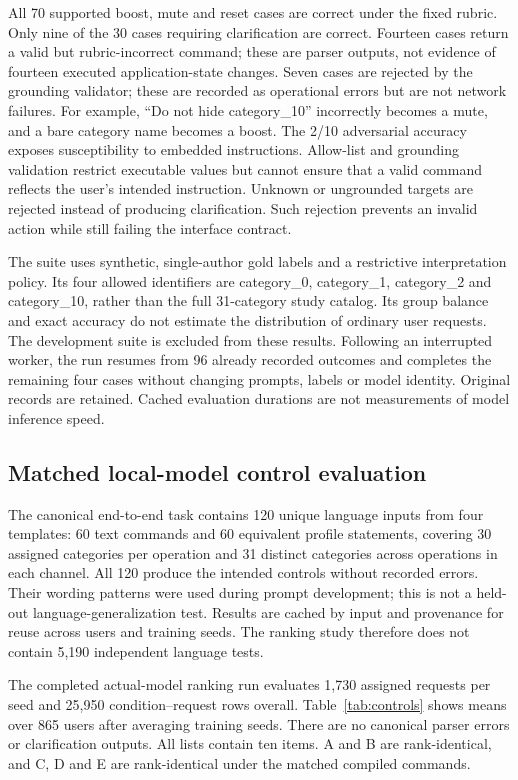 \documentclass[conference]{IEEEtran}
\begin{document}
All 70 supported boost, mute and reset cases are correct under the fixed rubric. Only nine of the 30 cases requiring clarification are correct. Fourteen cases return a valid but rubric-incorrect command; these are parser outputs, not evidence of fourteen executed application-state changes. Seven cases are rejected by the grounding validator; these are recorded as operational errors but are not network failures. For example, ``Do not hide category\_10'' incorrectly becomes a mute, and a bare category name becomes a boost. The 2/10 adversarial accuracy exposes susceptibility to embedded instructions. Allow-list and grounding validation restrict executable values but cannot ensure that a valid command reflects the user's intended instruction. Unknown or ungrounded targets are rejected instead of producing clarification. Such rejection prevents an invalid action while still failing the interface contract.

The suite uses synthetic, single-author gold labels and a restrictive interpretation policy. Its four allowed identifiers are category\_0, category\_1, category\_2 and category\_10, rather than the full 31-category study catalog. Its group balance and exact accuracy do not estimate the distribution of ordinary user requests. The development suite is excluded from these results. Following an interrupted worker, the run resumes from 96 already recorded outcomes and completes the remaining four cases without changing prompts, labels or model identity. Original records are retained. Cached evaluation durations are not measurements of model inference speed.

\subsection{Matched local-model control evaluation}
The canonical end-to-end task contains 120 unique language inputs from four templates: 60 text commands and 60 equivalent profile statements, covering 30 assigned categories per operation and 31 distinct categories across operations in each channel. All 120 produce the intended controls without recorded errors. Their wording patterns were used during prompt development; this is not a held-out language-generalization test. Results are cached by input and provenance for reuse across users and training seeds. The ranking study therefore does not contain 5,190 independent language tests.

The completed actual-model ranking run evaluates 1,730 assigned requests per seed and 25,950 condition--request rows overall. Table~\ref{tab:controls} shows means over 865 users after averaging training seeds. There are no canonical parser errors or clarification outputs. All lists contain ten items. A and B are rank-identical, and C, D and E are rank-identical under the matched compiled commands.
\end{document}
